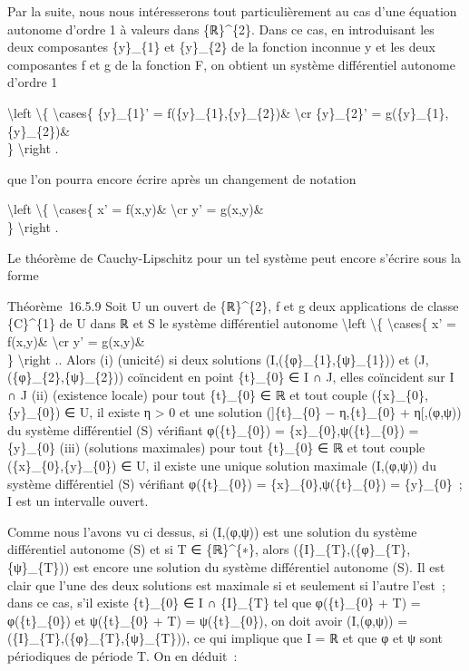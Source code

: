 \documentclass[]{article}
\begin{document}
Par la suite, nous nous intéresserons tout particulièrement au cas d'une
équation autonome d'ordre 1 à valeurs dans \{ℝ\}\^{}\{2\}. Dans ce cas,
en introduisant les deux composantes \{y\}\_\{1\} et \{y\}\_\{2\} de la
fonction inconnue y et les deux composantes f et g de la fonction F, on
obtient un système différentiel autonome d'ordre 1

\textbackslash{}left \textbackslash{}\{ \textbackslash{}cases\{
\{y\}\_\{1\}' = f(\{y\}\_\{1\},\{y\}\_\{2\})\& \textbackslash{}cr
\{y\}\_\{2\}' = g(\{y\}\_\{1\},\{y\}\_\{2\})\&\\ \}
\textbackslash{}right .

que l'on pourra encore écrire après un changement de notation

\textbackslash{}left \textbackslash{}\{ \textbackslash{}cases\{ x' =
f(x,y)\& \textbackslash{}cr y' = g(x,y)\&\\ \} \textbackslash{}right .

Le théorème de Cauchy-Lipschitz pour un tel système peut encore s'écrire
sous la forme

Théorème~16.5.9 Soit U un ouvert de \{ℝ\}\^{}\{2\}, f et g deux
applications de classe \{C\}\^{}\{1\} de U dans ℝ et S le système
différentiel autonome \textbackslash{}left \textbackslash{}\{
\textbackslash{}cases\{ x' = f(x,y)\& \textbackslash{}cr y' = g(x,y)\&\\
\} \textbackslash{}right .. Alors (i) (unicité) si deux solutions
(I,(\{φ\}\_\{1\},\{ψ\}\_\{1\})) et (J,(\{φ\}\_\{2\},\{ψ\}\_\{2\}))
coïncident en point \{t\}\_\{0\} ∈ I ∩ J, elles coïncident sur I ∩ J
(ii) (existence locale) pour tout \{t\}\_\{0\} ∈ ℝ et tout couple
(\{x\}\_\{0\},\{y\}\_\{0\}) ∈ U, il existe η \textgreater{} 0 et une
solution ({]}\{t\}\_\{0\} − η,\{t\}\_\{0\} + η{[},(φ,ψ)) du système
différentiel (S) vérifiant φ(\{t\}\_\{0\}) =
\{x\}\_\{0\},ψ(\{t\}\_\{0\}) = \{y\}\_\{0\} (iii) (solutions maximales)
pour tout \{t\}\_\{0\} ∈ ℝ et tout couple (\{x\}\_\{0\},\{y\}\_\{0\}) ∈
U, il existe une unique solution maximale (I,(φ,ψ)) du système
différentiel (S) vérifiant φ(\{t\}\_\{0\}) =
\{x\}\_\{0\},ψ(\{t\}\_\{0\}) = \{y\}\_\{0\}~; I est un intervalle
ouvert.

Comme nous l'avons vu ci dessus, si (I,(φ,ψ)) est une solution du
système différentiel autonome (S) et si T ∈ \{ℝ\}\^{}\{∗\}, alors
(\{I\}\_\{T\},(\{φ\}\_\{T\},\{ψ\}\_\{T\})) est encore une solution du
système différentiel autonome (S). Il est clair que l'une des deux
solutions est maximale si et seulement si l'autre l'est~; dans ce cas,
s'il existe \{t\}\_\{0\} ∈ I ∩ \{I\}\_\{T\} tel que φ(\{t\}\_\{0\} + T)
= φ(\{t\}\_\{0\}) et ψ(\{t\}\_\{0\} + T) = ψ(\{t\}\_\{0\}), on doit
avoir (I,(φ,ψ)) = (\{I\}\_\{T\},(\{φ\}\_\{T\},\{ψ\}\_\{T\})), ce qui
implique que I = ℝ et que φ et ψ sont périodiques de période T. On en
déduit~:
\end{document}
